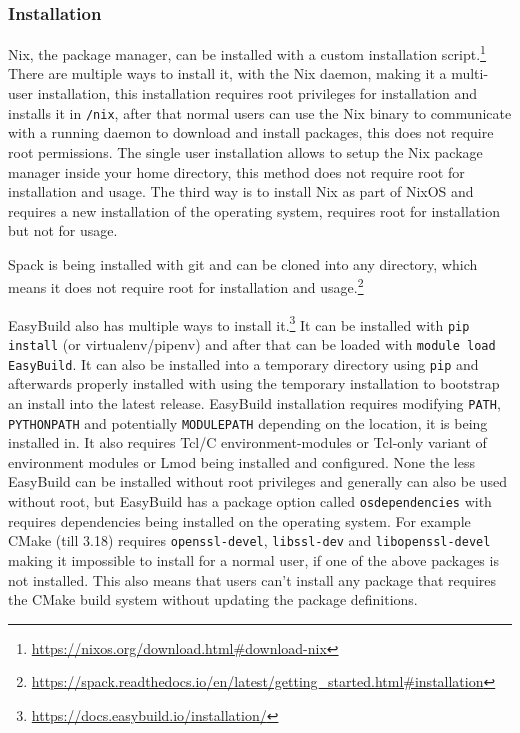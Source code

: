 \documentclass[conference,final,a4paper]{IEEEtran}
\begin{document}
\subsubsection{Installation}

Nix, the package manager, can be installed with a custom installation script.\footnote{\url{https://nixos.org/download.html\#download-nix}}
There are multiple ways to install it, with the Nix daemon, making it a multi-user installation, this installation requires root privileges for installation and installs it in \texttt{/nix}, after that normal users can use the Nix binary to communicate with a running daemon to download and install packages, this does not require root permissions.
The single user installation allows to setup the Nix package manager inside your home directory, this method does not require root for installation and usage.
The third way is to install Nix as part of NixOS and requires a new installation of the operating system, requires root for installation but not for usage.

Spack is being installed with git and can be cloned into any directory, which means it does not require root for installation and usage.\footnote{\url{https://spack.readthedocs.io/en/latest/getting_started.html\#installation}}

EasyBuild also has multiple ways to install it.\footnote{\url{https://docs.easybuild.io/installation/}}
It can be installed with \texttt{pip install} (or virtualenv/pipenv) and after that can be loaded with \texttt{module load EasyBuild}.
It can also be installed into a temporary directory using \texttt{pip} and afterwards properly installed with using the temporary installation to bootstrap an install into the latest release.
EasyBuild installation requires modifying \texttt{PATH}, \texttt{PYTHONPATH} and potentially \texttt{MODULEPATH} depending on the location, it is being installed in.
It also requires Tcl/C environment-modules or Tcl-only variant of environment modules or Lmod being installed and configured.
None the less EasyBuild can be installed without root privileges and generally can also be used without root, but EasyBuild has a package option called \texttt{osdependencies} with requires dependencies being installed on the operating system.
For example CMake (till 3.18) requires \texttt{openssl-devel}, \texttt{libssl-dev} and \texttt{libopenssl-devel} making it impossible to install for a normal user, if one of the above packages is not installed.
This also means that users can't install any package that requires the CMake build system without updating the package definitions.
\end{document}

